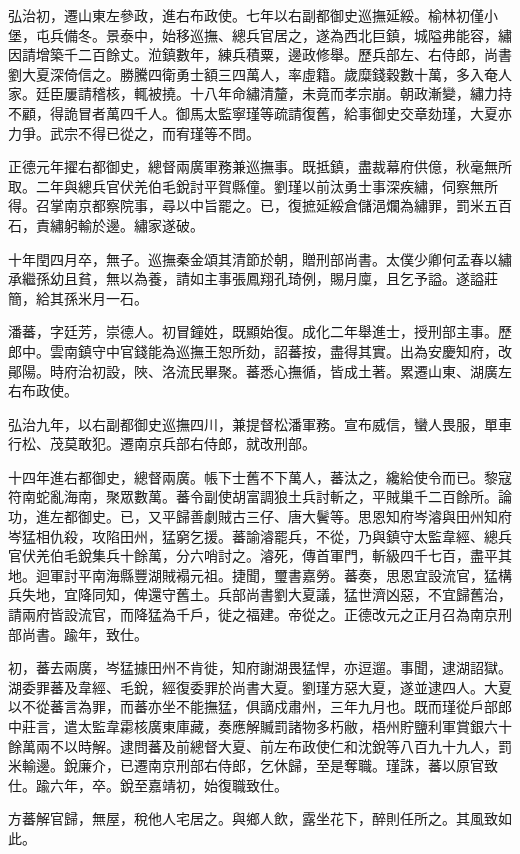 \begin{pinyinscope}
弘治初，遷山東左參政，進右布政使。七年以右副都御史巡撫延綏。榆林初僅小堡，屯兵備冬。景泰中，始移巡撫、總兵官居之，遂為西北巨鎮，城隘弗能容，繡因請增築千二百餘丈。涖鎮數年，練兵積粟，邊政修舉。歷兵部左、右侍郎，尚書劉大夏深倚信之。勝騰四衛勇士額三四萬人，率虛籍。歲糜錢穀數十萬，多入奄人家。廷臣屢請稽核，輒被撓。十八年命繡清釐，未竟而孝宗崩。朝政漸變，繡力持不顧，得詭冒者萬四千人。御馬太監寧瑾等疏請復舊，給事御史交章劾瑾，大夏亦力爭。武宗不得已從之，而宥瑾等不問。

正德元年擢右都御史，總督兩廣軍務兼巡撫事。既抵鎮，盡裁幕府供億，秋毫無所取。二年與總兵官伏羌伯毛銳討平賀縣僮。劉瑾以前汰勇士事深疾繡，伺察無所得。召掌南京都察院事，尋以中旨罷之。已，復摭延綏倉儲浥爛為繡罪，罰米五百石，責繡躬輸於邊。繡家遂破。

十年閏四月卒，無子。巡撫秦金頌其清節於朝，贈刑部尚書。太僕少卿何孟春以繡承繼孫幼且貧，無以為養，請如主事張鳳翔孔琦例，賜月廩，且乞予謚。遂謚莊簡，給其孫米月一石。

潘蕃，字廷芳，崇德人。初冒鐘姓，既顯始復。成化二年舉進士，授刑部主事。歷郎中。雲南鎮守中官錢能為巡撫王恕所劾，詔蕃按，盡得其實。出為安慶知府，改鄖陽。時府治初設，陜、洛流民畢聚。蕃悉心撫循，皆成土著。累遷山東、湖廣左右布政使。

弘治九年，以右副都御史巡撫四川，兼提督松潘軍務。宣布威信，蠻人畏服，單車行松、茂莫敢犯。遷南京兵部右侍郎，就改刑部。

十四年進右都御史，總督兩廣。帳下士舊不下萬人，蕃汰之，纔給使令而已。黎寇符南蛇亂海南，聚眾數萬。蕃令副使胡富調狼土兵討斬之，平賊巢千二百餘所。論功，進左都御史。已，又平歸善劇賊古三仔、唐大鬢等。思恩知府岑濬與田州知府岑猛相仇殺，攻陷田州，猛窮乞援。蕃諭濬罷兵，不從，乃與鎮守太監韋經、總兵官伏羌伯毛銳集兵十餘萬，分六哨討之。濬死，傳首軍門，斬級四千七百，盡平其地。迴軍討平南海縣豐湖賊褟元祖。捷聞，璽書嘉勞。蕃奏，思恩宜設流官，猛構兵失地，宜降同知，俾還守舊土。兵部尚書劉大夏議，猛世濟凶惡，不宜歸舊治，請兩府皆設流官，而降猛為千戶，徙之福建。帝從之。正德改元之正月召為南京刑部尚書。踰年，致仕。

初，蕃去兩廣，岑猛據田州不肯徙，知府謝湖畏猛悍，亦逗遛。事聞，逮湖詔獄。湖委罪蕃及韋經、毛銳，經復委罪於尚書大夏。劉瑾方惡大夏，遂並逮四人。大夏以不從蕃言為罪，而蕃亦坐不能撫猛，俱謫戍肅州，三年九月也。既而瑾從戶部郎中莊言，遣太監韋霦核廣東庫藏，奏應解贓罰諸物多朽敝，梧州貯鹽利軍賞銀六十餘萬兩不以時解。逮問蕃及前總督大夏、前左布政使仁和沈銳等八百九十九人，罰米輸邊。銳廉介，已遷南京刑部右侍郎，乞休歸，至是奪職。瑾誅，蕃以原官致仕。踰六年，卒。銳至嘉靖初，始復職致仕。

方蕃解官歸，無屋，稅他人宅居之。與鄉人飲，露坐花下，醉則任所之。其風致如此。


\end{pinyinscope}
